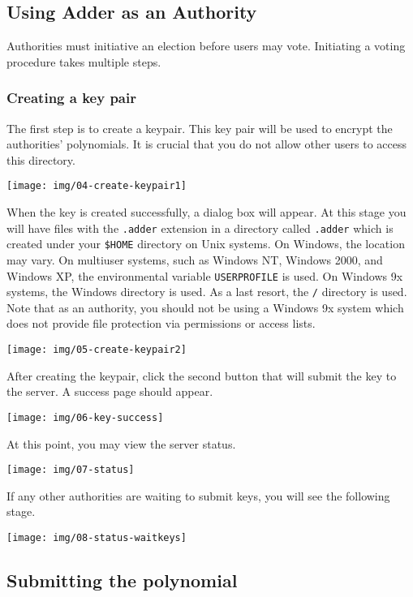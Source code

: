 \documentclass[letterpaper,10pt]{article}
\begin{document}
\subsection{Using Adder as an Authority}

Authorities must initiative an election before users may vote.
Initiating a voting procedure takes multiple steps.

\subsubsection{Creating a key pair}

The first step is to create a keypair. This key pair will be used to
encrypt the authorities' polynomials. It is crucial that you do not
allow other users to access this directory.

\texttt{[image: img/04-create-keypair1]}

When the key is created successfully, a dialog box will appear. At
this stage you will have files with the \texttt{.adder} extension in
a directory called \texttt{.adder} which is created under your
\texttt{\$HOME} directory on Unix systems. On Windows, the location
may vary. On multiuser systems, such as Windows NT, Windows 2000,
and Windows XP, the environmental variable \texttt{USERPROFILE} is
used. On Windows 9x systems, the Windows directory is used. As a
last resort, the \texttt{/} directory is used. Note that as an
authority, you should not be using a Windows 9x system which does
not provide file protection via permissions or access lists.

\texttt{[image: img/05-create-keypair2]}

After creating the keypair, click the second button that will submit
the key to the server. A success page should appear.

\texttt{[image: img/06-key-success]}

At this point, you may view the server status.

\texttt{[image: img/07-status]}

If any other authorities are waiting to submit keys, you will see
the following stage.

\texttt{[image: img/08-status-waitkeys]}

\subsection{Submitting the polynomial}
\end{document}

